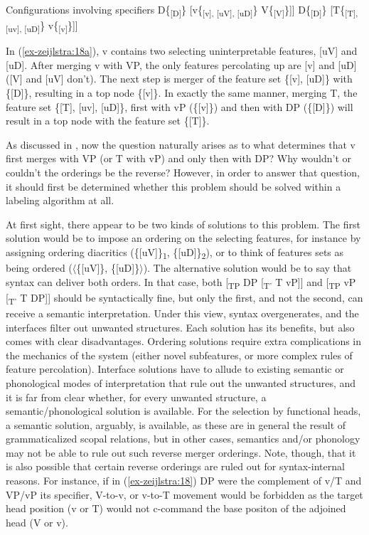 \documentclass[output=paper
,modfonts
,nonflat]{langsci/langscibook}
\begin{document}
\begin{exe}
	\ex Configurations involving specifiers \label{ex-zeijlstra:18}
		\xlist
		\ex {[}D\{\textsubscript{{[}D{]}}\} \label{ex-zeijlstra:18a} {[}v\{\textsubscript{{[}v{]}, {[}uV{]}, {[}uD{]}}\} V\{\textsubscript{{[}V{]}}\}{]}{]}
		\ex {[}D\{\textsubscript{{[}D{]}}\} {[}T\{\textsubscript{{[}T{]}, {[}uv{]}, {[}uD{]}}\} v\{\textsubscript{{[}v{]}}\}{]}{]}
		\endxlist
	\end{exe}
In (\ref{ex-zeijlstra:18a}), v contains two selecting uninterpretable features, [uV] and [uD]. After merging v with VP, the only features percolating up are [v] and [uD] ([V] and [uV] don’t). The next step is merger of the feature set \{[v], [uD]\} with \{[D]\}, resulting in a top node \{[v]\}. In exactly the same manner, merging T, the feature set \{[T], [uv], [uD]\}, first with vP (\{[v]\}) and then with DP (\{[D]\}) will result in a top node with the feature set \{[T]\}.

As discussed in , now the question naturally arises as to what determines that v first merges with VP (or T with vP) and only then with DP? Why wouldn’t or couldn’t the orderings be the reverse? However, in order to answer that question, it should first be determined whether this problem should be solved within a labeling algorithm at all.

At first sight, there appear to be two kinds of solutions to this problem. The first solution would be to impose an ordering on the selecting features, for instance by assigning ordering diacritics (\{[uV]\}\textsubscript{1}, \{[uD]\}\textsubscript{2}), or to think of features sets as being ordered ($\langle$\{[uV]\}, \{[uD]\}$\rangle$). The alternative solution would be to say that syntax can deliver both orders. In that case, both [\textsubscript{TP} DP [\textsubscript{T’} T vP]] and [\textsubscript{TP} vP [\textsubscript{T’} T DP]] should be syntactically fine, but only the first, and not the second, can receive a semantic interpretation. Under this view, syntax overgenerates, and the interfaces filter out unwanted structures. Each solution has its benefits, but also comes with clear disadvantages. Ordering solutions require extra complications in the mechanics of the system (either novel subfeatures, or more complex rules of feature percolation). Interface solutions have to allude to existing semantic or phonological modes of interpretation that rule out the unwanted structures, and it is far from clear whether, for every unwanted structure, a semantic\slash phonological solution is available. For the selection by functional heads, a semantic solution, arguably, is available, as these are in general the result of grammaticalized scopal relations, but in other cases, semantics and\slash or phonology may not be able to rule out such reverse merger orderings. Note, though, that it is also possible that certain reverse orderings are ruled out for syntax-internal reasons. For instance, if in (\ref{ex-zeijlstra:18}) DP were the complement of v/T and VP/vP its specifier, V-to-v, or v-to-T movement would be forbidden as the target head position (v or T) would not c-command the base positon of the adjoined head (V or v).
\end{document}
